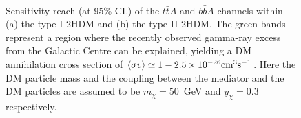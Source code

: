 \documentclass[preprintnumbers,superscriptaddress,nofootinbib,aps,prd,floatfix]{revtex4}
\begin{document}
\begin{figure}[htbp]
\begin{center}
 \\
\caption{Sensitivity reach (at 95\% CL) of the $t\bar{t}A$ and $b\bar {b} A$ channels within (a) the type-I 2HDM and (b) the type-II 2HDM. The green bands represent a region where the recently observed gamma-ray excess from the Galactic Centre can be explained, yielding a DM annihilation cross section of $\langle \sigma v \rangle  \simeq 1-2.5 \times 10^{-26} {\rm cm}^3 {\rm s}^{-1}$. Here the DM particle mass and the coupling between the mediator and the DM particles 
are assumed to be $m_{\chi}=50$~GeV and $y_\chi= 0.3$ respectively.  }
\label{fig:reach_2HDM} 
\end{center}
\end{figure}
\end{document}
